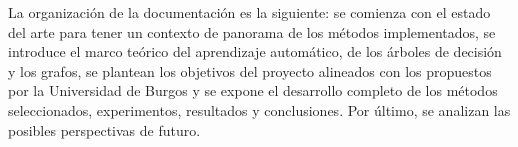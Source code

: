 La organización de la documentación es la siguiente: se comienza con el estado del arte para tener un contexto de panorama de los métodos implementados, se introduce el marco teórico del aprendizaje automático, de los árboles de decisión y los grafos, se plantean los objetivos del proyecto alineados con los propuestos por la Universidad de Burgos y se expone el desarrollo completo de los métodos seleccionados, experimentos, resultados y conclusiones. Por último, se analizan las posibles perspectivas de futuro.
\clearpage